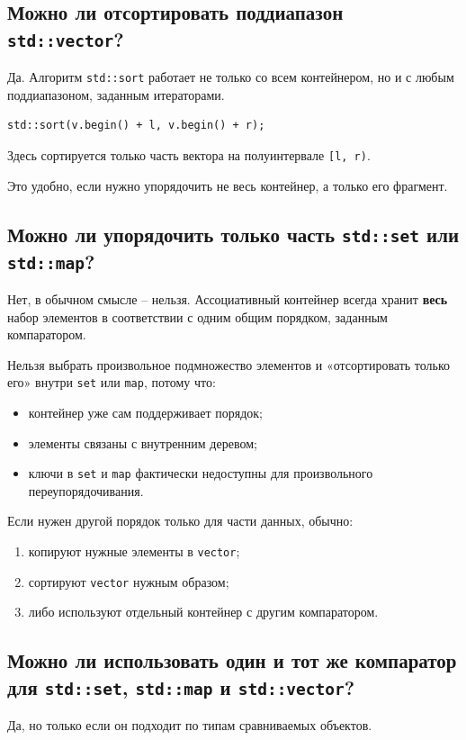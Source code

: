 \subsection{Можно ли отсортировать поддиапазон \texttt{std::vector}?}
Да. Алгоритм \texttt{std::sort} работает не только со всем контейнером, но и с любым поддиапазоном, заданным итераторами.

\begin{example}
\begin{verbatim}
std::sort(v.begin() + l, v.begin() + r);
\end{verbatim}
\end{example}

Здесь сортируется только часть вектора на полуинтервале \texttt{[l, r)}.

Это удобно, если нужно упорядочить не весь контейнер, а только его фрагмент.

\subsection{Можно ли упорядочить только часть \texttt{std::set} или \texttt{std::map}?}
Нет, в обычном смысле -- нельзя. Ассоциативный контейнер всегда хранит \textbf{весь} набор элементов в соответствии с одним общим порядком, заданным компаратором.

Нельзя выбрать произвольное подмножество элементов и «отсортировать только его» внутри \texttt{set} или \texttt{map}, потому что:
\begin{itemize}
    \item контейнер уже сам поддерживает порядок;
    \item элементы связаны с внутренним деревом;
    \item ключи в \texttt{set} и \texttt{map} фактически недоступны для произвольного переупорядочивания.
\end{itemize}

Если нужен другой порядок только для части данных, обычно:
\begin{enumerate}
    \item копируют нужные элементы в \texttt{vector};
    \item сортируют \texttt{vector} нужным образом;
    \item либо используют отдельный контейнер с другим компаратором.
\end{enumerate}

\subsection{Можно ли использовать один и тот же компаратор для \texttt{std::set}, \texttt{std::map} и \texttt{std::vector}?}
Да, но только если он подходит по типам сравниваемых объектов.


